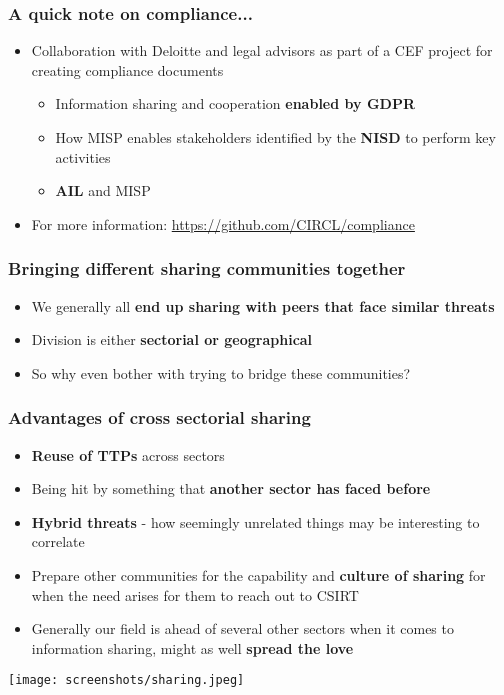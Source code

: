 \begin{frame}
\frametitle{A quick note on compliance...}
\begin{itemize}
	\item Collaboration with Deloitte and legal advisors as part of a CEF project for creating compliance documents
	\begin{itemize}
		\item Information sharing and cooperation {\bf enabled by GDPR}
		\item How MISP enables stakeholders identified by the {\bf NISD} to perform key activities
		\item {\bf AIL} and MISP
	\end{itemize}
\item For more information: \url{https://github.com/CIRCL/compliance}
\end{itemize}
\end{frame}

\begin{frame}
\frametitle{Bringing different sharing communities together}
\begin{itemize}
	\item We generally all {\bf end up sharing with peers that face similar threats}
	\item Division is either {\bf sectorial or geographical}
	\item So why even bother with trying to bridge these communities?
\end{itemize}
\end{frame}

\begin{frame}
\frametitle{Advantages of cross sectorial sharing}
\begin{itemize}
	\item {\bf Reuse of TTPs} across sectors
	\item Being hit by something that {\bf another sector has faced before}
	\item {\bf Hybrid threats} - how seemingly unrelated things may be interesting to correlate
	\item Prepare other communities for the capability and {\bf culture of sharing} for when the need arises for them to reach out to CSIRT
	\item Generally our field is ahead of several other sectors when it comes to information sharing, might as well {\bf spread the love}
\end{itemize}
\texttt{[image: screenshots/sharing.jpeg]}
\end{frame}

